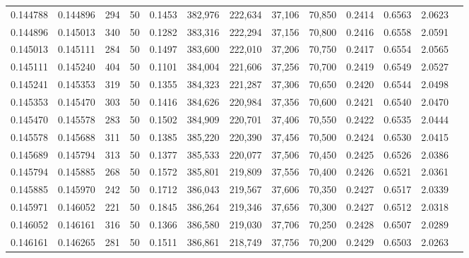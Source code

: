 \begin{tabular}{rrrrrrrrrrrrr}
0.144788 & 0.144896 &   294 &  50 &                                     0.1453 & 382,976 & 222,634 &  37,106 &  70,850 & 0.2414 & 0.6563 & 2.0623 \\
0.144896 & 0.145013 &   340 &  50 &                                     0.1282 & 383,316 & 222,294 &  37,156 &  70,800 & 0.2416 & 0.6558 & 2.0591 \\
0.145013 & 0.145111 &   284 &  50 &                                     0.1497 & 383,600 & 222,010 &  37,206 &  70,750 & 0.2417 & 0.6554 & 2.0565 \\
0.145111 & 0.145240 &   404 &  50 &                                     0.1101 & 384,004 & 221,606 &  37,256 &  70,700 & 0.2419 & 0.6549 & 2.0527 \\
0.145241 & 0.145353 &   319 &  50 &                                     0.1355 & 384,323 & 221,287 &  37,306 &  70,650 & 0.2420 & 0.6544 & 2.0498 \\
0.145353 & 0.145470 &   303 &  50 &                                     0.1416 & 384,626 & 220,984 &  37,356 &  70,600 & 0.2421 & 0.6540 & 2.0470 \\
0.145470 & 0.145578 &   283 &  50 &                                     0.1502 & 384,909 & 220,701 &  37,406 &  70,550 & 0.2422 & 0.6535 & 2.0444 \\
0.145578 & 0.145688 &   311 &  50 &                                     0.1385 & 385,220 & 220,390 &  37,456 &  70,500 & 0.2424 & 0.6530 & 2.0415 \\
0.145689 & 0.145794 &   313 &  50 &                                     0.1377 & 385,533 & 220,077 &  37,506 &  70,450 & 0.2425 & 0.6526 & 2.0386 \\
0.145794 & 0.145885 &   268 &  50 &                                     0.1572 & 385,801 & 219,809 &  37,556 &  70,400 & 0.2426 & 0.6521 & 2.0361 \\
0.145885 & 0.145970 &   242 &  50 &                                     0.1712 & 386,043 & 219,567 &  37,606 &  70,350 & 0.2427 & 0.6517 & 2.0339 \\
0.145971 & 0.146052 &   221 &  50 &                                     0.1845 & 386,264 & 219,346 &  37,656 &  70,300 & 0.2427 & 0.6512 & 2.0318 \\
0.146052 & 0.146161 &   316 &  50 &                                     0.1366 & 386,580 & 219,030 &  37,706 &  70,250 & 0.2428 & 0.6507 & 2.0289 \\
0.146161 & 0.146265 &   281 &  50 &                                     0.1511 & 386,861 & 218,749 &  37,756 &  70,200 & 0.2429 & 0.6503 & 2.0263 \\

\end{tabular}
